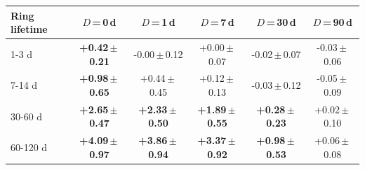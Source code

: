\begin{tabular}{@{}lccccc@{}}
\toprule
Ring lifetime & $D$\,=\,0\,d & $D$\,=\,1\,d & $D$\,=\,7\,d & $D$\,=\,30\,d & $D$\,=\,90\,d \\
\midrule
1-3 d & \textbf{+0.42\,$\pm$\,0.21} & -0.00\,$\pm$\,0.12 & +0.00\,$\pm$\,0.07 & -0.02\,$\pm$\,0.07 & -0.03\,$\pm$\,0.06 \\
7-14 d & \textbf{+0.98\,$\pm$\,0.65} & +0.44\,$\pm$\,0.45 & +0.12\,$\pm$\,0.13 & -0.03\,$\pm$\,0.12 & -0.05\,$\pm$\,0.09 \\
30-60 d & \textbf{+2.65\,$\pm$\,0.47} & \textbf{+2.33\,$\pm$\,0.50} & \textbf{+1.89\,$\pm$\,0.55} & \textbf{+0.28\,$\pm$\,0.23} & +0.02\,$\pm$\,0.10 \\
60-120 d & \textbf{+4.09\,$\pm$\,0.97} & \textbf{+3.86\,$\pm$\,0.94} & \textbf{+3.37\,$\pm$\,0.92} & \textbf{+0.98\,$\pm$\,0.53} & +0.06\,$\pm$\,0.08 \\
\bottomrule
\end{tabular}
